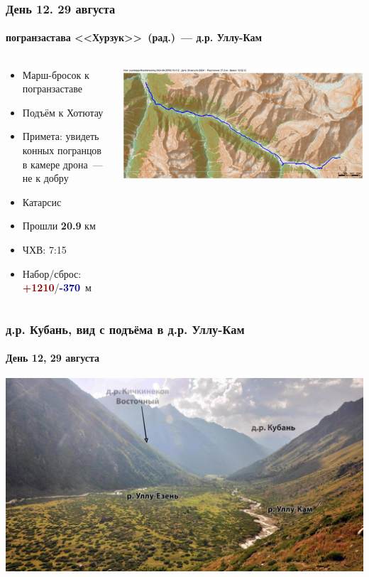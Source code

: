\begin{frame}
	\frametitle{День 12. 29 августа}
	\framesubtitle{погранзастава <<Хурзук>>~(рад.)~--- д.р. Уллу-Кам} %
	\begin{columns}[c] %
		\begin{column}{0.55\textwidth} %
			\begin{itemize}
				\item Марш-бросок к погранзаставе
				\item Подъём к Хотютау
				\item Примета: увидеть конных погранцов в камере дрона~--- не к добру
				\item Катарсис
				\item Прошли \textbf{20.9} км
				\item ЧХВ: 7:15
				\item Набор/сброс: \textcolor{darkred}{\textbf{+1210}}/\textcolor{darkblue}{\textbf{-370}}~м
			\end{itemize}			
		\end{column}
		\begin{column}{0.45\textwidth} %
			\centering
			\includegraphics[width=\linewidth]{../pics/mini_maps/29}
		\end{column}
	\end{columns}
\end{frame}

\begin{frame}
	\frametitle{д.р. Кубань, вид с подъёма в д.р. Уллу-Кам}
	\framesubtitle{День 12, 29 августа}	
	\centering
	\includegraphics[width=\textwidth]{../pics/DSC_0464 2}			
\end{frame}

